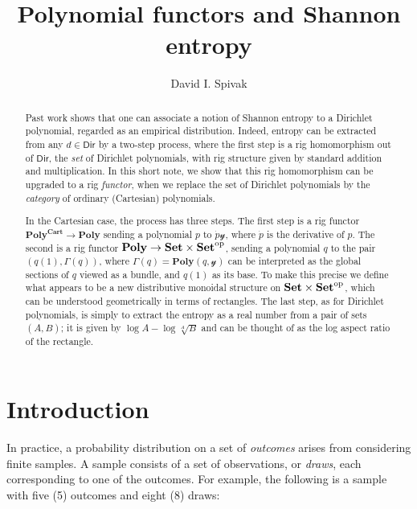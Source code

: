 \documentclass[11pt, one side, article]{memoir}
\theoremstyle{definition}
\theoremstyle{plain}
\newcommand{\Set}[1]{\mathsf{#1}}%
\newcommand{\Cat}[1]{\mathbf{#1}}%
\newcommand{\op}{^\tn{op}}
\newcommand{\tn}[1]{\textnormal{#1}}
\newcommand{\smset}{\Cat{Set}}
\newcommand{\yon}{\mathcal{y}}
\newcommand{\poly}{\Cat{Poly}}
\newcommand{\dir}{\Set{Dir}}
\newcommand{\polycart}{\poly^{\Cat{Cart}}}
\newcommand{\0}{\textsf{0}}
\newcommand{\1}{\tn{\textsf{1}}}
\begin{document}
\title{Polynomial functors and Shannon entropy}

\author{David I. Spivak}

\date{\vspace{-.2in}}

\maketitle

\begin{abstract}
Past work shows that one can associate a notion of Shannon entropy to a Dirichlet polynomial, regarded as an empirical distribution. Indeed, entropy can be extracted from any $d\in\dir$ by a two-step process, where the first step is a rig homomorphism out of $\dir$, the \emph{set} of Dirichlet polynomials, with rig structure given by standard addition and multiplication. In this short note, we show that this rig homomorphism can be upgraded to a rig \emph{functor}, when we replace the set of Dirichlet polynomials by the \emph{category} of ordinary (Cartesian) polynomials.

In the Cartesian case, the process has three steps. The first step is a rig functor $\polycart\to\poly$ sending a polynomial $p$ to $\dot{p}\yon$, where $\dot{p}$ is the derivative of $p$. The second is a rig functor $\poly\to\smset\times\smset\op$, sending a polynomial $q$ to the pair $(q(1),\Gamma(q))$, where $\Gamma(q)=\poly(q,\yon)$ can be interpreted as the global sections of $q$ viewed as a bundle, and $q(1)$ as its base. To make this precise we define what appears to be a new distributive monoidal structure on $\smset\times\smset\op$, which can be understood geometrically in terms of rectangles. The last step, as for Dirichlet polynomials, is simply to extract the entropy as a real number from a pair of sets $(A,B)$; it is given by $\log A-\log \sqrt[A]{B}$ and can be thought of as the log aspect ratio of the rectangle.
\end{abstract}

\chapter{Introduction}

In practice, a probability distribution on a set of \emph{outcomes} arises from considering finite samples. A sample consists of a set of observations, or \emph{draws}, each corresponding to one of the outcomes. For example, the following is a sample with five (5) outcomes and eight (8) draws:
\end{document}
